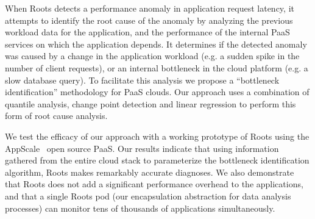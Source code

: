 
When Roots detects a performance anomaly in application request latency, 
it attempts to
identify the root cause of the anomaly by analyzing the previous workload 
data for the application,
and the performance of the internal PaaS services on which the application depends.
It determines if the detected anomaly was caused by a change in the
application workload (e.g. a sudden spike in the number of client requests), or an internal
bottleneck in the cloud platform (e.g. a slow database query). To facilitate
this analysis we propose a ``bottleneck identification'' methodology
for PaaS clouds. 
Our approach uses a combination of quantile analysis, change point detection
and linear regression to perform this form of root cause analysis. 

We test the efficacy of our approach with a working prototype of 
Roots using the AppScale~\cite{6488671} open source PaaS. 
Our results indicate that using information gathered from the entire cloud
stack to parameterize the bottleneck identification algorithm, Roots
makes remarkably accurate diagnoses.
We also demonstrate that Roots does not add a significant performance overhead
to the applications, and that a single Roots pod (our encapsulation abstraction for
data analysis processes) can monitor tens of thousands
of applications simultaneously.

